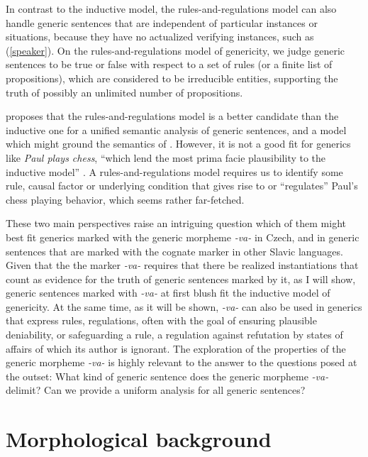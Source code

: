\documentclass[output=paper,colorlinks,citecolor=brown]{langscibook}
\begin{document}
In contrast to the inductive model, the rules-and-regulations model can
also handle generic sentences  that are independent of particular instances or situations, because they have no actualized verifying instances, such as (\ref{speaker}).
On the rules-and-regulations model of genericity, we judge generic sentences to be true or false with respect to a set of rules (or a finite list of propositions), which are considered to be irreducible entities, supporting the truth of possibly an unlimited number of propositions. 

\citet{carlson1995truth} proposes that the rules-and-regulations model is a better candidate than the inductive one 
for a unified semantic analysis of generic sentences, and a model
which might ground the semantics of .
However, it is not a good fit for generics
like \textit{Paul plays chess}, ``which lend the most prima facie plausibility to the inductive model'' \citep[237]{carlson1995truth}.
A rules-and-regulations model requires us to identify some rule, causal factor or underlying condition that gives rise to or ``regulates'' Paul's chess playing behavior, which seems rather far-fetched. 

These two main perspectives raise an intriguing question which of them might best fit generics marked with the generic morpheme \textit{-va-} in Czech, and in generic sentences that are marked with the cognate marker in other Slavic languages.  Given that the the marker \textit{-va-} requires that there be realized instantiations that count as evidence for the truth of generic sentences marked by it, as I will show, generic sentences
marked with \textit{-va-} at first blush fit the inductive model of genericity.
At the same time, as it will be shown, \textit{-va-} can also be used in generics that express rules, regulations, often with the goal of ensuring plausible deniability, or safeguarding a rule, a regulation against refutation by states of affairs 
of which its author is ignorant. 
The exploration of the properties of the generic morpheme \textit{-va-} is highly relevant to the answer to the questions posed at the outset: What kind of generic sentence does the generic morpheme \textit{-va-} delimit? Can we provide a uniform analysis for all generic sentences?

\section{Morphological background} \label{basicmorphology}
\end{document}
